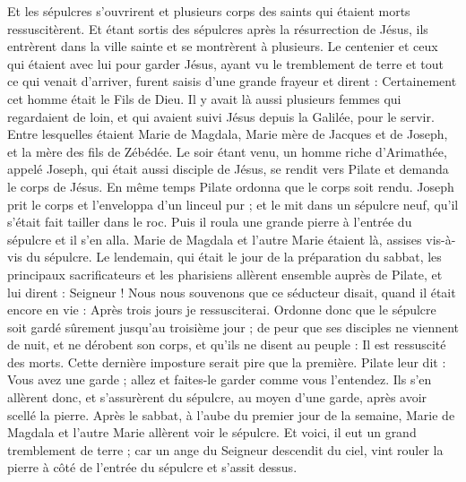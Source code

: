 \begin{multicols}{2}
Et les sépulcres s'ouvrirent et plusieurs corps des saints qui étaient morts ressuscitèrent.
Et étant sortis des sépulcres après la résurrection de Jésus, ils entrèrent dans la ville sainte et se montrèrent à plusieurs.
Le centenier et ceux qui étaient avec lui pour garder Jésus, ayant vu le tremblement de terre et tout ce qui venait d'arriver, furent saisis d'une grande frayeur et dirent : Certainement cet homme était le Fils de Dieu.
Il y avait là aussi plusieurs femmes qui regardaient de loin, et qui avaient suivi Jésus depuis la Galilée, pour le servir.
Entre lesquelles étaient Marie de Magdala, Marie mère de Jacques et de Joseph, et la mère des fils de Zébédée.
Le soir étant venu, un homme riche d'Arimathée, appelé Joseph, qui était aussi disciple de Jésus,
se rendit vers Pilate et demanda le corps de Jésus. En même temps Pilate ordonna que le corps soit rendu.
Joseph prit le corps et l'enveloppa d'un linceul pur ;
et le mit dans un sépulcre neuf, qu'il s'était fait tailler dans le roc. Puis il roula une grande pierre à l'entrée du sépulcre et il s'en alla.
Marie de Magdala et l'autre Marie étaient là, assises vis-à-vis du sépulcre.
Le lendemain, qui était le jour de la préparation du sabbat, les principaux sacrificateurs et les pharisiens allèrent ensemble auprès de Pilate,
et lui dirent : Seigneur ! Nous nous souvenons que ce séducteur disait, quand il était encore en vie : Après trois jours je ressusciterai.
Ordonne donc que le sépulcre soit gardé sûrement jusqu'au troisième jour ; de peur que ses disciples ne viennent de nuit, et ne dérobent son corps, et qu'ils ne disent au peuple : Il est ressuscité des morts. Cette dernière imposture serait pire que la première.
Pilate leur dit : Vous avez une garde ; allez et faites-le garder comme vous l'entendez.
Ils s'en allèrent donc, et s'assurèrent du sépulcre, au moyen d'une garde, après avoir scellé la pierre.
\VerseOne{}Après le sabbat, à l'aube du premier jour de la semaine, Marie de Magdala et l'autre Marie allèrent voir le sépulcre.
Et voici, il eut un grand tremblement de terre ; car un ange du Seigneur descendit du ciel, vint rouler la pierre à côté de l'entrée du sépulcre et s'assit dessus.

\end{multicols}
